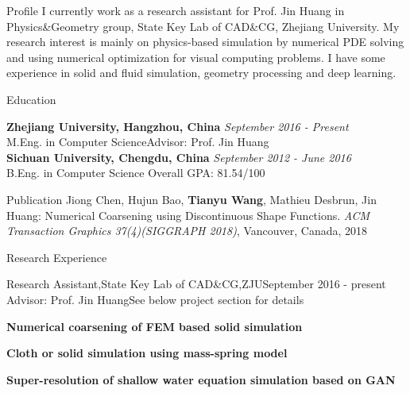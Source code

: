 \documentclass{resume} %
\begin{document}
\begin{rSection}{Profile}
I currently work as a research assistant for Prof. Jin Huang in Physics\&Geometry group, State Key Lab of CAD\&CG, Zhejiang University. My research interest is mainly on physics-based simulation by numerical PDE solving and using numerical optimization for visual computing problems. I have some experience in solid and fluid simulation, geometry processing and deep learning. 
\end{rSection}

\begin{rSection}{Education}

{\bf Zhejiang University, Hangzhou, China} \hfill {\em September 2016 - Present} 
\\ M.Eng. in Computer Science\hfill {Advisor: Prof. Jin Huang} 
\\{\bf Sichuan University, Chengdu, China} \hfill {\em September 2012 - June 2016} 
\\ B.Eng. in Computer Science\hfill { Overall GPA: 81.54/100 }

\end{rSection}

\begin{rSection}{Publication}
Jiong Chen, Hujun Bao, \textbf{Tianyu Wang}, Mathieu Desbrun, Jin Huang: Numerical Coarsening using Discontinuous Shape Functions. \emph{ACM Transaction Graphics 37(4)(SIGGRAPH 2018)}, Vancouver, Canada, 2018
\end{rSection}

\iffalse
\begin{rSection}{Work Experience}
\end{rSection}
\fi

\begin{rSection}{Research Experience}

  \begin{rSubsection}{Research Assistant,State Key Lab of CAD\&CG,ZJU}{September 2016 - present}
    {Advisor: Prof. Jin Huang}{See below project section for details}
\item {\bf Numerical coarsening of FEM based solid simulation}
\item {\bf Cloth or solid simulation using mass-spring model} 
\item {\bf Super-resolution of shallow water equation simulation based on GAN}
  \end{rSubsection}

\end{rSection}
\end{document}
